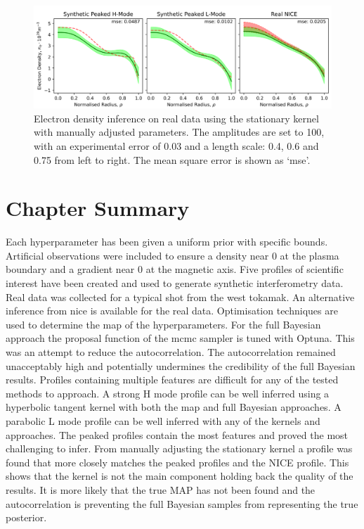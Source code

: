 \begin{figure}[H]
    \centering
    \includegraphics[width=\textwidth]{images/Final/manual.png}
    \caption{Electron density inference on real data using the stationary kernel with manually adjusted parameters. The amplitudes are set to 100, with an experimental error of 0.03 and a length scale: 0.4, 0.6 and 0.75 from left to right. The mean square error is shown as `mse'.}
    \label{fig:manual}
\end{figure}

\section{Chapter Summary}

Each hyperparameter has been given a uniform prior with specific bounds. Artificial observations were included to ensure a density near 0 at the plasma boundary and a gradient near 0 at the magnetic axis. Five profiles of scientific interest have been created and used to generate synthetic interferometry data. Real data was collected for a typical shot from the \gls{west} tokamak. An alternative inference from \gls{nice} is available for the real data. Optimisation techniques are used to determine the \gls{map} of the hyperparameters. For the full Bayesian approach the proposal function of the \gls{mcmc} sampler is tuned with Optuna. This was an attempt to reduce the autocorrelation. The autocorrelation remained unacceptably high and potentially undermines the credibility of the full Bayesian results. Profiles containing multiple features are difficult for any of the tested methods to approach. A strong H mode profile can be well inferred using a hyperbolic tangent kernel with both the \gls{map} and full Bayesian approaches. A parabolic L mode profile can be well inferred with any of the kernels and approaches. The peaked profiles contain the most features and proved the most challenging to infer. From manually adjusting the stationary kernel a profile was found that more closely matches the peaked profiles and the NICE profile. This shows that the kernel is not the main component holding back the quality of the results. It is more likely that the true MAP has not been found and the autocorrelation is preventing the full Bayesian samples from representing the true posterior.



